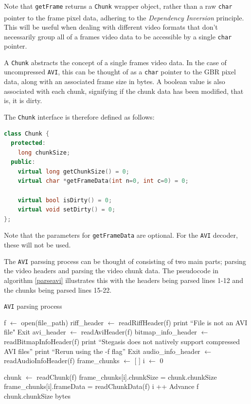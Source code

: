 \documentclass[paper=a4, fontsize=11pt,twoside]{scrartcl}
\numberwithin{table}{section}
\numberwithin{figure}{section}
\numberwithin{algorithm}{section}
\begin{document}
Note that \texttt{getFrame} returns a \texttt{Chunk} wrapper object, rather than a raw \texttt{char} pointer to the frame pixel data, adhering to the \textit{Dependency Inversion} principle\textsuperscript{\cite{inver}}. This will be useful when dealing with different video formats that don't necessarily group all of a frames video data to be accessible by a single \texttt{char} pointer.

A \texttt{Chunk} abstracts the concept of a single frames video data. In the case of uncompressed \texttt{AVI}, this can be thought of as a \texttt{char} pointer to the GBR pixel data, along with an associated frame size in bytes. A boolean value is also associated with each chunk, signifying if the chunk data has been modified, that is, it is dirty.

The \texttt{Chunk} interface is therefore defined as follows:

\begin{lstlisting}[language=C++, caption={Chunk interface (\texttt{video/video\_decoder.h:4})}, frame=single]
class Chunk {
  protected:
    long chunkSize;
  public:
    virtual long getChunkSize() = 0;
    virtual char *getFrameData(int n=0, int c=0) = 0;
   
    virtual bool isDirty() = 0;
    virtual void setDirty() = 0;
};
\end{lstlisting}

\noindent
Note that the parameters for \texttt{getFrameData} are optional. For the \texttt{AVI} decoder, these will not be used.

The \texttt{AVI} parssing process can be thought of consisting of two main parts; parsing the video headers and parsing the video chunk data. The pseudocode in algorithm \ref{parseavi} illustrates this with the headers being parsed lines 1-12 and the chunks being parsed lines 15-22.

\begin{algorithm}[!h]
\caption{\texttt{AVI} parsing process}
\label{parseavi}
\begin{algorithmic}[1]
\State f $\gets$ open(file\_path)
\State riff\_header $\gets$ readRiffHeader(f)
	\State print ``File is not an AVI file"
	\State Exit
\EndIf
\State avi\_header $\gets$ readAviHeader(f)
\State bitmap\_info\_header $\gets$ readBitmapInfoHeader(f)
	\State print ``Stegasis does not natively support compressed AVI files''
	\State print ``Rerun using the -f flag''
	\State Exit
\EndIf
\State audio\_info\_header $\gets$ readAudioInfoHeader(f)
\State frame\_chunks $\gets$ [ ]
\State i $\gets$ 0

	\State chunk $\gets$ readChunk(f)
		\State frame\_chunks[i].chunkSize = chunk.chunkSize
		\State frame\_chunks[i].frameData = readChunkData(f)
		\State i ++
	\Else
		\State Advance f chunk.chunkSize bytes
	\EndIf
\EndWhile
\end{algorithmic}
\end{algorithm}
\end{document}
